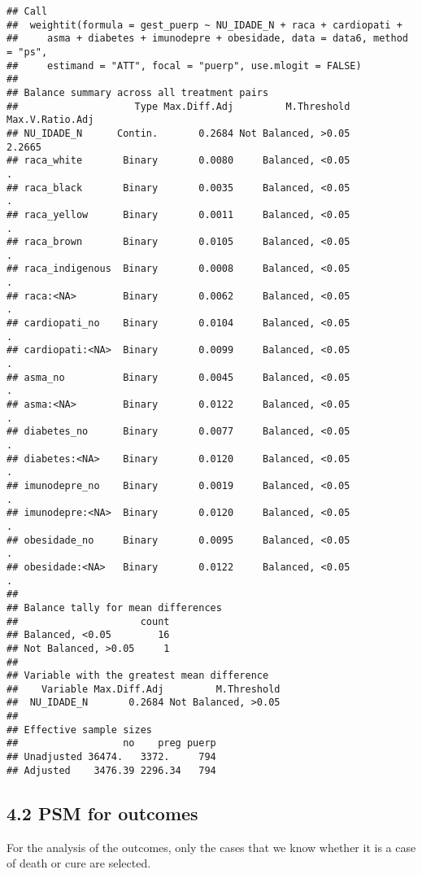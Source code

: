 \documentclass[
]{article}
\begin{document}
\begin{verbatim}
## Call
##  weightit(formula = gest_puerp ~ NU_IDADE_N + raca + cardiopati + 
##     asma + diabetes + imunodepre + obesidade, data = data6, method = "ps", 
##     estimand = "ATT", focal = "puerp", use.mlogit = FALSE)
## 
## Balance summary across all treatment pairs
##                    Type Max.Diff.Adj         M.Threshold Max.V.Ratio.Adj
## NU_IDADE_N      Contin.       0.2684 Not Balanced, >0.05          2.2665
## raca_white       Binary       0.0080     Balanced, <0.05               .
## raca_black       Binary       0.0035     Balanced, <0.05               .
## raca_yellow      Binary       0.0011     Balanced, <0.05               .
## raca_brown       Binary       0.0105     Balanced, <0.05               .
## raca_indigenous  Binary       0.0008     Balanced, <0.05               .
## raca:<NA>        Binary       0.0062     Balanced, <0.05               .
## cardiopati_no    Binary       0.0104     Balanced, <0.05               .
## cardiopati:<NA>  Binary       0.0099     Balanced, <0.05               .
## asma_no          Binary       0.0045     Balanced, <0.05               .
## asma:<NA>        Binary       0.0122     Balanced, <0.05               .
## diabetes_no      Binary       0.0077     Balanced, <0.05               .
## diabetes:<NA>    Binary       0.0120     Balanced, <0.05               .
## imunodepre_no    Binary       0.0019     Balanced, <0.05               .
## imunodepre:<NA>  Binary       0.0120     Balanced, <0.05               .
## obesidade_no     Binary       0.0095     Balanced, <0.05               .
## obesidade:<NA>   Binary       0.0122     Balanced, <0.05               .
## 
## Balance tally for mean differences
##                     count
## Balanced, <0.05        16
## Not Balanced, >0.05     1
## 
## Variable with the greatest mean difference
##    Variable Max.Diff.Adj         M.Threshold
##  NU_IDADE_N       0.2684 Not Balanced, >0.05
## 
## Effective sample sizes
##                  no    preg puerp
## Unadjusted 36474.   3372.     794
## Adjusted    3476.39 2296.34   794
\end{verbatim}

\hypertarget{psm-for-outcomes}{%
\subsection{4.2 PSM for outcomes}\label{psm-for-outcomes}}

For the analysis of the outcomes, only the cases that we know whether it
is a case of death or cure are selected.
\end{document}
